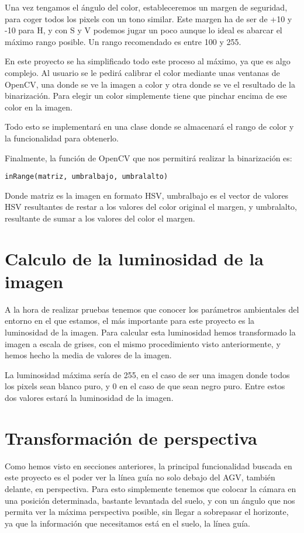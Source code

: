Una vez tengamos el ángulo del color, estableceremos un margen de seguridad\cite{track_hsv}, para coger todos los pixels con un tono similar. Este margen ha de ser de +10 y -10 para H, y con S y V podemos jugar un poco aunque lo ideal es abarcar el máximo rango posible. Un rango recomendado es entre 100 y 255.


En este proyecto se ha simplificado todo este proceso al máximo, ya que es algo complejo. Al usuario se le pedirá calibrar el color mediante unas ventanas de OpenCV, una donde se ve la imagen a color y otra donde se ve el resultado de la binarización. Para elegir un color simplemente tiene que pinchar encima de ese color en la imagen.

Todo esto se implementará en una clase donde se almacenará el rango de color y la funcionalidad para obtenerlo.

Finalmente, la función de OpenCV que nos permitirá realizar la binarización es:
\begin{verbatim}
inRange(matriz, umbralbajo, umbralalto)
\end{verbatim}

Donde matriz es la imagen en formato HSV, umbralbajo es el vector de valores HSV resultantes de restar a los valores del color original el margen, y umbralalto, resultante de sumar a los valores del color el margen.

\section{Calculo de la luminosidad de la imagen}
A la hora de realizar pruebas tenemos que conocer los parámetros ambientales del entorno en el que estamos, el más importante para este proyecto es la luminosidad de la imagen. Para calcular esta luminosidad hemos transformado la imagen a escala de grises, con el mismo procedimiento visto anteriormente, y hemos hecho la media de valores de la imagen.

La luminosidad máxima sería de 255, en el caso de ser una imagen donde todos los pixels sean blanco puro, y 0 en el caso de que sean negro puro. Entre estos dos valores estará la luminosidad de la imagen.


\section{Transformación de perspectiva}
Como hemos visto en secciones anteriores, la principal funcionalidad buscada en este proyecto es el poder ver la línea guía no solo debajo del AGV, también delante, en perspectiva. Para esto simplemente tenemos que colocar la cámara en una posición determinada, bastante levantada del suelo, y con un ángulo que nos permita ver la máxima perspectiva posible, sin llegar a sobrepasar el horizonte, ya que la información que necesitamos está en el suelo, la línea guía.

